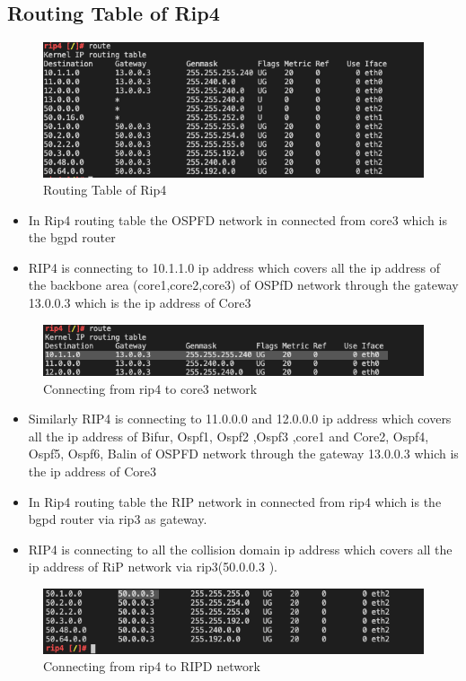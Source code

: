 \subsection{Routing Table of Rip4}
\begin{figure}[H]
\centering
  \includegraphics[width=1.4\textwidth]{Images/route rip4.png}
  \caption{Routing Table of Rip4  }
  \label{fig }
\end{figure}
\begin{itemize}
    \item In Rip4 routing table the OSPFD network in connected from core3 which is the bgpd router 
    \item RIP4 is connecting to 10.1.1.0 ip address which covers all the ip address of the backbone area (core1,core2,core3) of OSPfD network through the gateway 13.0.0.3 which is the ip address of Core3 
\end{itemize}
\begin{figure}[H]
\centering
  \includegraphics[width=1.3\textwidth]{Images/rip4 routing to core3.png}
  \caption{Connecting from rip4 to core3 network}
  \label{fig }
\end{figure}
\begin{itemize}
    \item Similarly RIP4 is connecting to 11.0.0.0 and 12.0.0.0 ip address which covers all the ip address of Bifur, Ospf1, Ospf2 ,Ospf3 ,core1 and Core2, Ospf4, Ospf5, Ospf6, Balin of OSPFD network through the gateway 13.0.0.3 which is the ip address of Core3 
\end{itemize}
\begin{itemize}
    \item In Rip4 routing table the RIP network in connected from rip4 which is the bgpd router via rip3 as gateway.
    \item RIP4 is connecting to all the collision domain ip address which covers all the ip address of RiP network via rip3(50.0.0.3 ).
    \end{itemize}
 \begin{figure}[H]
\centering
  \includegraphics[width=1.3\textwidth]{Images/rip4 to ripd.png}
  \caption{Connecting from rip4 to RIPD network}
  \label{fig }
\end{figure}  

